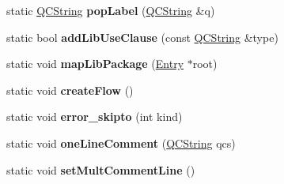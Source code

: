 \begin{DoxyCompactItemize}
static \mbox{\hyperlink{class_q_c_string}{Q\+C\+String}} {\bfseries pop\+Label} (\mbox{\hyperlink{class_q_c_string}{Q\+C\+String}} \&q)
\item 
\mbox{\label{classvhdl_1_1parser_1_1_vhdl_parser_a8f47c3d08368d2005c67041a15e23696}} 
static bool {\bfseries add\+Lib\+Use\+Clause} (const \mbox{\hyperlink{class_q_c_string}{Q\+C\+String}} \&type)
\item 
\mbox{\label{classvhdl_1_1parser_1_1_vhdl_parser_acb249ae71b8fb216a92aa6278ac6e54f}} 
static void {\bfseries map\+Lib\+Package} (\mbox{\hyperlink{class_entry}{Entry}} $\ast$root)
\item 
\mbox{\label{classvhdl_1_1parser_1_1_vhdl_parser_a09fa425522d714bded7144d0c922033e}} 
static void {\bfseries create\+Flow} ()
\item 
\mbox{\label{classvhdl_1_1parser_1_1_vhdl_parser_ae9547049a8237f96043ebda8c55f147f}} 
static void {\bfseries error\+\_\+skipto} (int kind)
\item 
\mbox{\label{classvhdl_1_1parser_1_1_vhdl_parser_a8b128d6b6293f5bedab2e9ccac52fbe3}} 
static void {\bfseries one\+Line\+Comment} (\mbox{\hyperlink{class_q_c_string}{Q\+C\+String}} qcs)
\item 
\mbox{\label{classvhdl_1_1parser_1_1_vhdl_parser_a8af4efbc3df2608a56e12e55ac7b3a3f}} 
static void {\bfseries set\+Mult\+Comment\+Line} ()
\end{DoxyCompactItemize}
